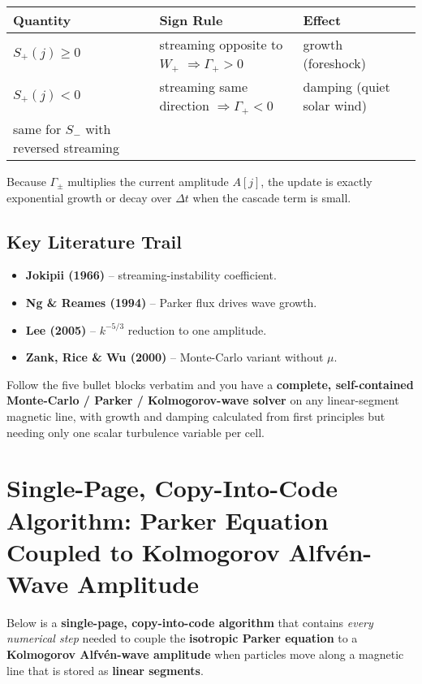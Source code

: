 \begin{tabular}{|l|l|l|}
\hline
\textbf{Quantity} & \textbf{Sign Rule} & \textbf{Effect} \\
\hline
$S_+(j) \ge 0$ & streaming opposite to $W_+$ $\Rightarrow \Gamma_+ > 0$ & growth (foreshock) \\
$S_+(j) < 0$ & streaming same direction $\Rightarrow \Gamma_+ < 0$ & damping (quiet solar wind) \\
same for $S_-$ with reversed streaming & & \\
\hline
\end{tabular}

Because $\Gamma_\pm$ multiplies the current amplitude $A[j]$, the update is exactly exponential growth or decay over $\Delta t$ when the cascade term is small.

\subsection*{Key Literature Trail}

\begin{itemize}
\item \textbf{Jokipii (1966)} – streaming-instability coefficient.
\item \textbf{Ng \& Reames (1994)} – Parker flux drives wave growth.
\item \textbf{Lee (2005)} – $k^{-5/3}$ reduction to one amplitude.
\item \textbf{Zank, Rice \& Wu (2000)} – Monte-Carlo variant without $\mu$.
\end{itemize}

\vspace{1em}

\noindent
Follow the five bullet blocks verbatim and you have a \textbf{complete, self-contained Monte-Carlo / Parker / Kolmogorov-wave solver} on any linear-segment magnetic line, with growth and damping calculated from first principles but needing only one scalar turbulence variable per cell.



\section*{Single-Page, Copy-Into-Code Algorithm: Parker Equation Coupled to Kolmogorov Alfvén-Wave Amplitude}

Below is a \textbf{single-page, copy-into-code algorithm} that contains \textit{every numerical step} needed to couple the \textbf{isotropic Parker equation} to a \textbf{Kolmogorov Alfvén-wave amplitude} when particles move along a magnetic line that is stored as \textbf{linear segments}.


